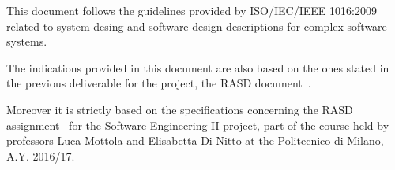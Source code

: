 This document follows the guidelines provided by ISO/IEC/IEEE 1016:2009~\cite{ieee-1016} related to system desing and software design descriptions for complex software systems.

The indications provided in this document are also based on the ones stated in the previous deliverable for the project, the RASD document~\cite{rasd}.

Moreover it is strictly based on the specifications concerning the RASD assignment~\cite{se-assignments} for the Software Engineering II project, part of the course held by professors Luca Mottola and Elisabetta Di Nitto at the Politecnico di Milano, A.Y. 2016/17.